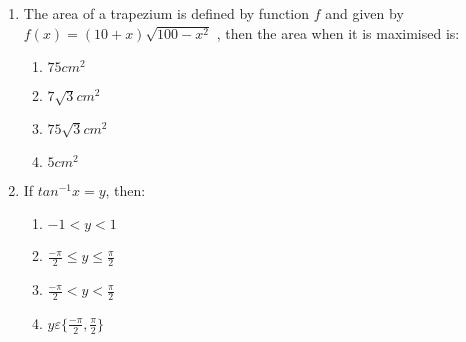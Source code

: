 \begin{enumerate}
\item The area of a trapezium is defined by function $f$ and given by $f(x) = (10 + x)\sqrt{100-x^2}$
, then the area when it is maximised is: 
\begin{enumerate}
    \item $75cm^2$
    \item $7\sqrt{3}cm^2$
    \item $75\sqrt{3}cm^2$
    \item $5cm^2$
\end{enumerate}

\item If $tan^{-1} x = y$, then: 
\begin{enumerate}
    \item $-1 < y < 1$
    \item $\frac{-\pi}{2} \leq y \leq \frac{\pi}{2}$
    \item $\frac{-\pi}{2} < y < \frac{\pi}{2}$
    \item $y \varepsilon\{\frac{-\pi}{2},\frac{\pi}{2}\}$
\end{enumerate}


\end{enumerate}

%
